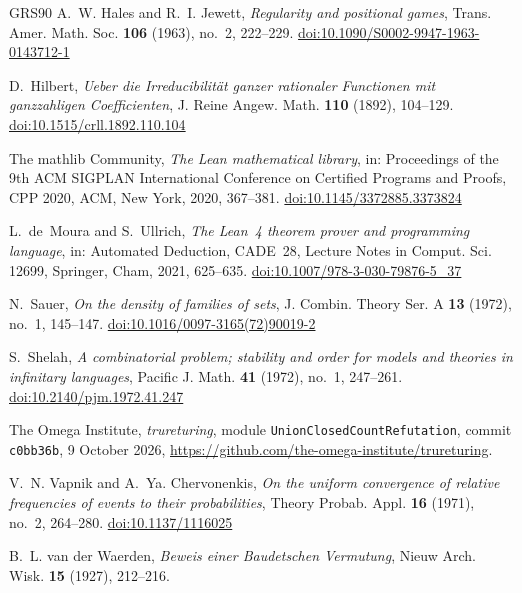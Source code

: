 \documentclass[11pt,reqno]{amsart}
\numberwithin{equation}{section}
\theoremstyle{plain}
\theoremstyle{definition}
\theoremstyle{remark}
\begin{document}
\begin{thebibliography}{GRS90}
A.~W. Hales and R.~I. Jewett,
\emph{Regularity and positional games},
Trans. Amer. Math. Soc. \textbf{106} (1963), no.~2, 222--229.
\href{https://doi.org/10.1090/S0002-9947-1963-0143712-1}{doi:10.1090/S0002-9947-1963-0143712-1}

D.~Hilbert,
\emph{Ueber die Irreducibilit\"at ganzer rationaler Functionen mit
ganzzahligen Coefficienten},
J. Reine Angew. Math. \textbf{110} (1892), 104--129.
\href{https://doi.org/10.1515/crll.1892.110.104}{doi:10.1515/crll.1892.110.104}

The mathlib Community,
\emph{The Lean mathematical library},
in: Proceedings of the 9th ACM SIGPLAN International Conference on
Certified Programs and Proofs, CPP 2020, ACM, New York, 2020, 367--381.
\href{https://doi.org/10.1145/3372885.3373824}{doi:10.1145/3372885.3373824}

L.~de~Moura and S.~Ullrich,
\emph{The Lean~4 theorem prover and programming language},
in: Automated Deduction, CADE~28,
Lecture Notes in Comput. Sci. 12699, Springer, Cham, 2021, 625--635.
\href{https://doi.org/10.1007/978-3-030-79876-5_37}{doi:10.1007/978-3-030-79876-5\_37}

N.~Sauer,
\emph{On the density of families of sets},
J. Combin. Theory Ser. A \textbf{13} (1972), no.~1, 145--147.
\href{https://doi.org/10.1016/0097-3165(72)90019-2}{doi:10.1016/0097-3165(72)90019-2}

S.~Shelah,
\emph{A combinatorial problem; stability and order for models and
theories in infinitary languages},
Pacific J. Math. \textbf{41} (1972), no.~1, 247--261.
\href{https://doi.org/10.2140/pjm.1972.41.247}{doi:10.2140/pjm.1972.41.247}

The Omega Institute,
\emph{trureturing}, module
\texttt{UnionClosedCountRefutation}, commit \texttt{c0bb36b},
9 October 2026,
\url{https://github.com/the-omega-institute/trureturing}.

V.~N. Vapnik and A.~Ya. Chervonenkis,
\emph{On the uniform convergence of relative frequencies of events to
their probabilities},
Theory Probab. Appl. \textbf{16} (1971), no.~2, 264--280.
\href{https://doi.org/10.1137/1116025}{doi:10.1137/1116025}

B.~L. van der Waerden,
\emph{Beweis einer Baudetschen Vermutung},
Nieuw Arch. Wisk. \textbf{15} (1927), 212--216.

\end{thebibliography}
\end{document}
